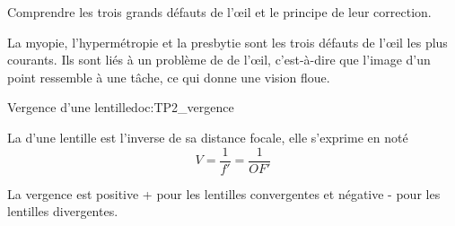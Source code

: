\tetePremStssVisi



\begin{objectifs}
  \item Comprendre les trois grands défauts de l'œil et le principe de leur correction.
\end{objectifs}

\begin{contexte}
  La myopie, l'hypermétropie et la presbytie sont les trois défauts de l'œil les plus courants.
  Ils sont liés à un problème de  de l'œil, c'est-à-dire que l'image d'un point ressemble à une tâche, ce qui donne une vision floue.
  
\end{contexte}


\begin{doc}{Vergence d'une lentille}{doc:TP2_vergence}
  \begin{importants}
    La  d'une lentille est l'inverse de sa distance focale, elle s'exprime en  noté \unit{\dioptre}
    \begin{equation*}  
      V = \dfrac{1}{f'} = \dfrac{1}{OF'}
    \end{equation*}
  \end{importants}

  La vergence est positive + pour les lentilles convergentes et négative - pour les lentilles divergentes.
\end{doc}

